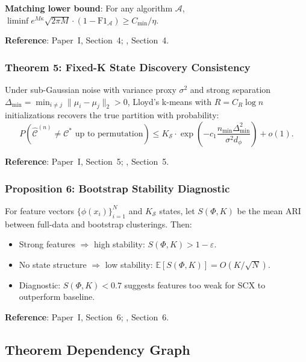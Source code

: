 \documentclass{article}
\begin{document}
\textbf{Matching lower bound}: For any algorithm $\mathcal{A}$, $\liminf e^{M\kappa}\sqrt{2\pi M}\cdot(1-\text{F1}_{\mathcal{A}}) \geq C_{\min}/\eta$.

\textbf{Reference}: Paper~I, Section~4; \cite{theorems_unified}, Section~4.

\subsubsection*{Theorem 5: Fixed-K State Discovery Consistency}
Under sub-Gaussian noise with variance proxy $\sigma^2$ and strong separation $\Delta_{\min} = \min_{i\neq j} \|\mu_i - \mu_j\|_2 > 0$, Lloyd's k-means with $R = C_R \log n$ initializations recovers the true partition with probability:
\begin{equation}
P(\hat{\mathcal{C}}^{(n)} \neq \mathcal{C}^* \text{ up to permutation}) \leq K_{\mathcal{S}} \cdot \exp\!\left(-c_1 \frac{n_{\min} \Delta_{\min}^2}{\sigma^2 d_\phi}\right) + o(1).
\end{equation}

\textbf{Reference}: Paper~I, Section~5; \cite{theorems_unified}, Section~5.

\subsubsection*{Proposition 6: Bootstrap Stability Diagnostic}
For feature vectors $\{\phi(x_i)\}_{i=1}^N$ and $K_{\mathcal{S}}$ states, let $S(\Phi, K)$ be the mean ARI between full-data and bootstrap clusterings. Then:
\begin{itemize}
\item Strong features $\Rightarrow$ high stability: $S(\Phi, K) > 1 - \varepsilon$.
\item No state structure $\Rightarrow$ low stability: $\mathbb{E}[S(\Phi, K)] = O(K/\sqrt{N})$.
\item Diagnostic: $S(\Phi, K) < 0.7$ suggests features too weak for SCX to outperform baseline.
\end{itemize}

\textbf{Reference}: Paper~I, Section~6; \cite{theorems_unified}, Section~6.

\subsection{Theorem Dependency Graph}
\label{sec:dependency}
\end{document}
